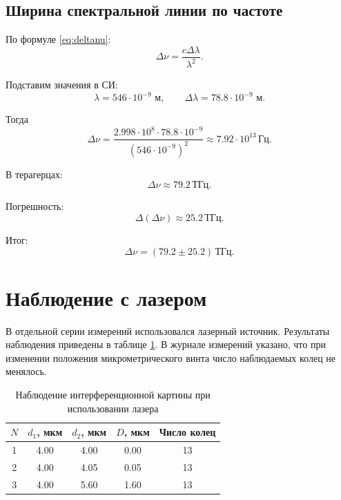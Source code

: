 \documentclass[12pt,a4paper]{article}
\newcommand{\Hz}{\ensuremath{\,\text{Гц}}}
\newcommand{\THz}{\ensuremath{\,\text{ТГц}}}
\begin{document}
\subsection{Ширина спектральной линии по частоте}

По формуле \eqref{eq:deltanu}:
\begin{equation}
    \Delta\nu = \frac{c\Delta\lambda}{\lambda^2}.
\end{equation}

Подставим значения в СИ:
\begin{equation}
    \lambda = 546\cdot 10^{-9}\text{ м}, \qquad
    \Delta\lambda = 78.8\cdot 10^{-9}\text{ м}.
\end{equation}

Тогда
\begin{equation}
    \Delta\nu = \frac{2.998\cdot 10^8\cdot 78.8\cdot 10^{-9}}{(546\cdot 10^{-9})^2}
    \approx 7.92\cdot 10^{13}\Hz.
\end{equation}

В терагерцах:
\begin{equation}
    \Delta\nu \approx 79.2\THz.
\end{equation}

Погрешность:
\begin{equation}
    \Delta(\Delta\nu) \approx 25.2\THz.
\end{equation}

Итог:
\begin{equation}
    \Delta\nu = (79.2 \pm 25.2)\THz.
\end{equation}

\section{Наблюдение с лазером}

В отдельной серии измерений использовался лазерный источник. Результаты наблюдения приведены в таблице \ref{tab:laser}. В журнале измерений указано, что при изменении положения микрометрического винта число наблюдаемых колец не менялось.

\begin{table}[H]
\centering
\caption{Наблюдение интерференционной картины при использовании лазера}
\label{tab:laser}
\begin{tabular}{ccccc}
\toprule
$N$ & $d_1$, мкм & $d_2$, мкм & $D$, мкм & Число колец \\
\midrule
1 & 4.00 & 4.00 & 0.00 & 13 \\
2 & 4.00 & 4.05 & 0.05 & 13 \\
3 & 4.00 & 5.60 & 1.60 & 13 \\
\bottomrule
\end{tabular}
\end{table}
\end{document}
